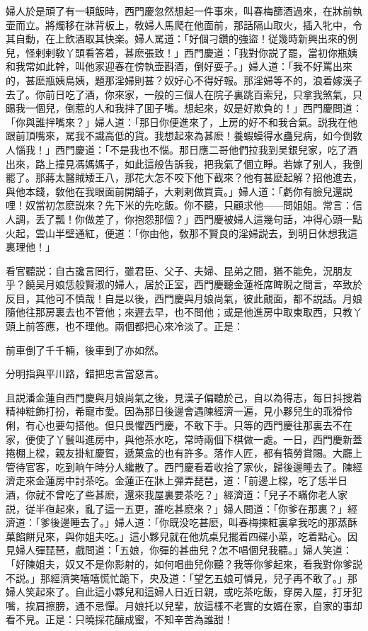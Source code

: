 婦人於是頑了有一頓飯時，西門慶忽然想起一件事來，叫春梅篩酒過來，在牀前執壶而立。將燭移在牀背板上，敎婦人馬爬在他面前，那話隔山取火，插入牝中，令其自動，在上飲酒取其快楽。婦人駡道：「好個刁鑽的強盜！従幾時新興出來的例兒，怪剌剌敎丫頭看答着，甚麽張致！」西門慶道：「我對你説了罷，當初你瓶姨和我常如此幹，叫他家迎春在傍執壶斟酒，倒好耍子。」婦人道：「我不好罵出來的，甚麽瓶姨鳥姨，題那淫婦則甚？奴好心不得好報。那淫婦等不的，浪着嫁漢子去了。你前日吃了酒，你來家，一般的三個人在院子裏跳百索兒，只拿我煞氣，只踢我一個兒，倒惹的人和我拌了囬子嘴。想起來，奴是好欺負的！」西門慶問道：「你與誰拌嘴來？」婦人道：「那日你便進來了，上房的好不和我合氣。説我在他跟前頂嘴來，駡我不識高低的貨。我想起來為甚麽！養蝦蟆得水蠱兒病，如今倒敎人惱我！」西門慶道：「不是我也不惱。那日應二哥他們拉我到吴銀兒家，吃了酒出來，路上撞見馮媽媽子，如此這般告訴我，把我氣了個立睜。若嫁了别人，我倒罷了。那蔣太醫賊矮王八，那花大怎不咬下他下截來？他有甚麽起解？招他進去，與他本錢，敎他在我眼面前開舖子，大剌剌做買賣。」婦人道：「虧你有臉兒還説哩！奴當初怎麽説來？先下米的先吃飯。你不聽，只顧求他——問姐姐。常言：信人調，丢了瓢！你做差了，你抱怨那個？」西門慶被婦人這幾句話，冲得心頭一點火起，雲山半壁通紅，便道：「你由他，敎那不賢良的淫婦説去，到明日休想我這裏理他！」

看官聽説：自古讒言罔行，雖君臣、父子、夫婦、昆弟之間，猶不能免，況朋友乎？饒吴月娘恁般賢淑的婦人，居於正室，西門慶聽金蓮袵席睥睨之間言，卒致於反目，其他可不慎哉！自是以後，西門慶與月娘尚氣，彼此覿面，都不説話。月娘隨他往那房裏去也不管他；來遲去早，也不問他；或是他進房中取東取西，只教丫頭上前答應，也不理他。兩個都把心來冷淡了。正是：

前車倒了千千輛，後車到了亦如然。

分明指與平川路，錯把忠言當惡言。

且説潘金蓮自西門慶與月娘尚氣之後，見漢子偏聽於己，自以為得志，每日抖搜着精神粧飾打扮，希寵巿愛。因為那日後邊會遇陳經濟一遍，見小夥兒生的乖猾伶俐，有心也要勾搭他。但只畏懼西門慶，不敢下手。只等的西門慶往那裏去不在家，便使了丫鬟叫進房中，與他茶水吃，常時兩個下棋做一處。一日，西門慶新蓋捲棚上樑，親友掛紅慶賀，遞菓盒的也有許多。落作人匠，都有犒勞賞賜。大廳上管待官客，吃到晌午時分人纔散了。西門慶看着收拾了家伙，歸後邊睡去了。陳經濟走來金蓮房中討茶吃。金蓮正在牀上彈弄琵琶，道：「前邊上樑，吃了恁半日酒，你就不曾吃了些甚麽，還來我屋裏要茶吃？」經濟道：「兒子不瞞你老人家説，従半亱起來，亂了這一五更，誰吃甚麽來？」婦人問道：「你爹在那裏？」經濟道：「爹後邊睡去了。」婦人道：「你既没吃甚麽，叫春梅揀粧裏拿我吃的那蒸酥菓餡餅兒來，與你姐夫吃。」這小夥兒就在他炕桌兒擺着四碟小菜，吃着點心。因見婦人彈琵琶，戲問道：「五娘，你彈的甚曲兒？怎不唱個兒我聽。」婦人笑道：「好陳姐夫，奴又不是你影射的，如何唱曲兒你聽？我等你爹起來，看我對你爹説不説。」那經濟笑嘻嘻慌忙跪下，央及道：「望乞五娘可憐見，兒子再不敢了。」那婦人笑起來了。自此這小夥兒和這婦人日近日親，或吃茶吃飯，穿房入屋，打牙犯嘴，挨肩擦膀，通不忌憚。月娘托以兒輩，放這樣不老實的女婿在家，自家的事却看不見。正是：只曉採花釀成蜜，不知辛苦為誰甜！

